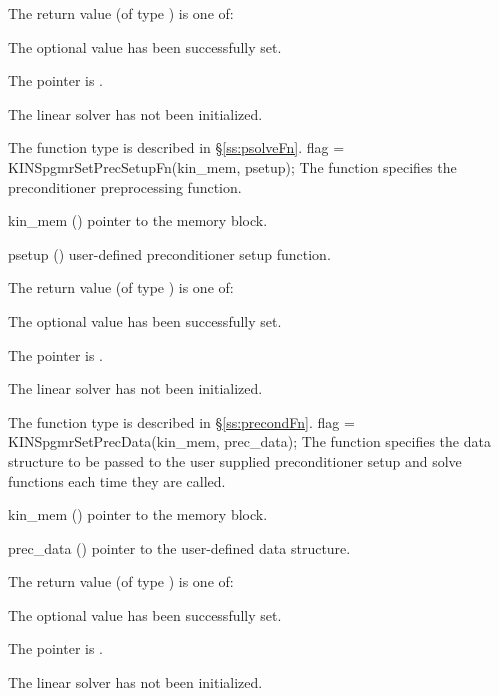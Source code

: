 {
  The return value  (of type ) is one of:
  \begin{args}
  \item[\Id{KINSPGMR\_SUCCESS}] 
    The optional value has been successfully set.
  \item[\Id{KINSPGMR\_MEM\_NULL}]
    The  pointer is .
  \item[\Id{KINSPGMR\_LMEM\_NULL}]
    The {\kinspgmr} linear solver has not been initialized.
  \end{args}
}
{
   The function type  is described in \S\ref{ss:psolveFn}.
}
{
  flag = KINSpgmrSetPrecSetupFn(kin\_mem, psetup);
}
{
  The function  specifies the preconditioner
  preprocessing function.
}
{
  \begin{args}
  \item[kin\_mem] ()
    pointer to the {\kinsol} memory block.
  \item[psetup] ()
    user-defined preconditioner setup function.
  \end{args}
}
{
  The return value  (of type ) is one of:
  \begin{args}
  \item[\Id{KINSPGMR\_SUCCESS}] 
    The optional value has been successfully set.
  \item[\Id{KINSPGMR\_MEM\_NULL}]
    The  pointer is .
  \item[\Id{KINSPGMR\_LMEM\_NULL}]
    The {\kinspgmr} linear solver has not been initialized.
  \end{args}
}
{
   The function type  is described in \S\ref{ss:precondFn}.
}
{
  flag = KINSpgmrSetPrecData(kin\_mem, prec\_data);
}
{
  The function  specifies the data structure
  to be passed to the user supplied preconditioner setup and solve
  functions each time they are called.
}
{
  \begin{args}
  \item[kin\_mem] ()
    pointer to the {\kinsol} memory block.
  \item[prec\_data] ()
     pointer to the user-defined data structure.
  \end{args}
}
{
  The return value  (of type ) is one of:
  \begin{args}
  \item[\Id{KINSPGMR\_SUCCESS}] 
    The optional value has been successfully set.
  \item[\Id{KINSPGMR\_MEM\_NULL}]
    The  pointer is .
  \item[\Id{KINSPGMR\_LMEM\_NULL}]
    The {\kinspgmr} linear solver has not been initialized.
  \end{args}
}
